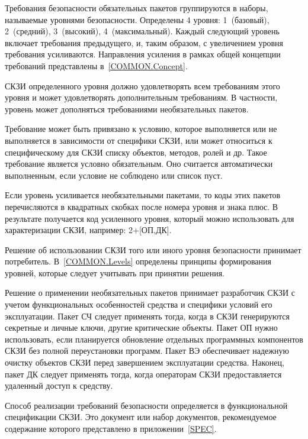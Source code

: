 Требования безопасности обязательных пакетов группируются в наборы, называемые 
уровнями безопасности. 
%
Определены 4 уровня: 1~(базовый), 2~(средний), 3~(высокий), 4~(максимальный).
%
Каждый следующий уровень включает требования предыдущего, и, таким 
образом, с увеличением уровня требования усиливаются.
%
Направления усиления в рамках общей концепции требований представлены 
в~\ref{COMMON.Concept}.


СКЗИ определенного уровня должно удовлетворять всем требованиям 
этого уровня и может удовлетворять дополнительным требованиям.
%
В частности, уровень может дополняться требованиями необязательных пакетов.

\begin{note*}
Требование может быть привязано к условию, которое выполняется или 
не выполняется в зависимости от специфики СКЗИ, или может относиться к 
специфическому для СКЗИ списку объектов, методов, ролей и др. 
%
Такое требование является условно обязательным. Оно считается автоматически 
выполненным, если условие не соблюдено или список пуст. 
\end{note*}

Если уровень усиливается необязательными пакетами, то коды этих пакетов 
перечисляются в квадратных скобках после номера уровня и знака плюс. 
В результате получается код усиленного уровня, который можно использовать 
для характеризации СКЗИ, например: 2+[ОП,ДК].

Решение об использовании СКЗИ того или иного уровня безопасности принимает 
потребитель. В~\ref{COMMON.Levels} определены принципы формирования уровней, 
которые следует учитывать при принятии решения.

Решение о применении необязательных пакетов принимает разработчик СКЗИ с учетом 
функциональных особенностей средства и специфики условий его эксплуатации. 
%
Пакет СЧ следует применять тогда, когда в СКЗИ генерируются секретные и личные 
ключи, другие критические объекты.
%
Пакет ОП нужно использовать, если планируется обновление отдельных программных 
компонентов СКЗИ без полной переустановки программ.  
%
Пакет ВЭ обеспечивает надежную очистку объектов СКЗИ перед завершением 
эксплуатации средства.
%
Наконец, пакет ДК следует применять тогда, когда операторам СКЗИ 
предоставляется удаленный доступ к средству.

Способ реализации требований безопасности определяется
в функциональной спецификации СКЗИ. Это документ или набор документов,
рекомендуемое содержание которого представлено в приложении~\ref{SPEC}.
